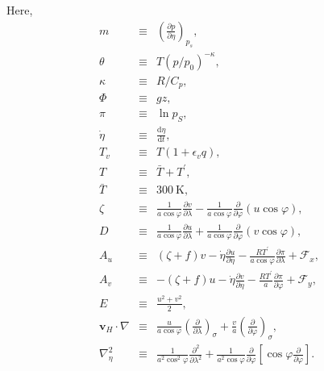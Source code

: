 Here,
\begin{eqnarray}
m &\equiv & \left(\frac{\partial p}{\partial \eta}\right)_{p_s}, \\
\theta  &\equiv &  T \left( p/p_{0} \right)^{-\kappa}, \\
\kappa  &\equiv &  R/C_{p}, \\
  \Phi  &\equiv &  gz, \\
   \pi  &\equiv &  \ln p_{S}, \\
 \dot{\eta}  &\equiv &   \frac{\mathrm{d}\eta}{\mathrm{d}t}, \\
     T_v  &\equiv &  T ( 1+\epsilon_v q ), \\
     T  &\equiv &   \bar{T} + T^{\prime}, \\
     \bar{T}&\equiv & 300 \ \mathrm{K}, \\
 \zeta  &\equiv &  \frac{1}{a \cos\varphi }
                    \frac{\partial v}{\partial \lambda} 
             -    \frac{1}{a \cos\varphi }
                    \frac{\partial }{\partial \varphi}
                    ( u \cos\varphi ), \\
     D  &\equiv &  \frac{1}{a \cos\varphi }
                    \frac{\partial u}{\partial \lambda} 
             +    \frac{1}{a \cos\varphi }
                    \frac{\partial }{\partial \varphi}
                    ( v \cos\varphi ), \\
    A_u  &\equiv &   ( \zeta + f ) v
             - \dot{\eta} \frac{\partial u}{\partial \eta} 
             - \frac{RT^{\prime}}{a\cos\varphi} 
                  \frac{\partial \pi}{\partial \lambda} 
             + {\mathcal F}_x, \\
    A_v  &\equiv &  - ( \zeta + f ) u
             - \dot{\eta} \frac{\partial v}{\partial \eta} 
             - \frac{RT^{\prime}}{a}
                  \frac{\partial \pi}{\partial \varphi} 
             + {\mathcal F}_y, \\
     E  &\equiv &   \frac{u^{2}+v^{2}}{2}, \\
 {\mathbf{v}}_{H} \cdot \nabla
        &\equiv &  \frac{u}{a \cos \varphi} 
         \left( \frac{\partial }{\partial \lambda} \right)_{\sigma}
     + \frac{v}{a}
         \left( \frac{\partial }{\partial \varphi} \right)_{\sigma}, \\
  \nabla^{2}_{\eta}  
        &\equiv &  
               \frac{1}{a^{2}\cos^2\varphi} 
                 \frac{\partial^{2} }{\partial \lambda^{2}} 
             + \frac{1}{a^{2}\cos\varphi} 
                 \frac{\partial }{\partial \varphi}
                 \left[ \cos\varphi
                       \frac{\partial }{\partial \varphi} \right].
\end{eqnarray}

